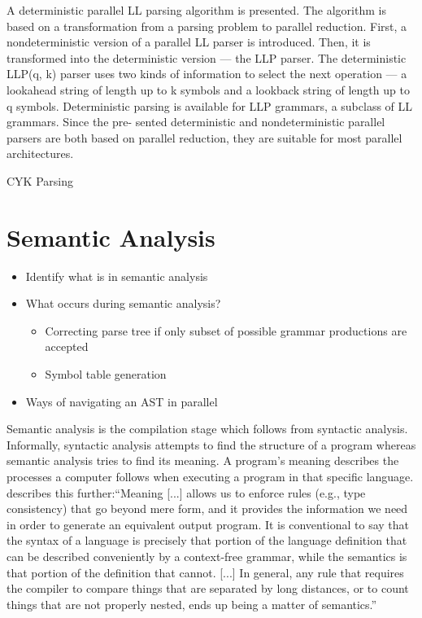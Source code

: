 \cite{vagner_parallel_2007} A deterministic parallel LL parsing algorithm is
presented. The algorithm is based on a transformation from a parsing problem to
parallel reduction. First, a nondeterministic version of a parallel LL parser
is introduced. Then, it is transformed into the deterministic version — the
LLP parser. The deterministic LLP(q, k) parser uses two kinds of information to
select the next operation — a lookahead string of length up to k symbols and a
lookback string of length up to q symbols. Deterministic parsing is available
for LLP grammars, a subclass of LL grammars. Since the pre- sented deterministic
and nondeterministic parallel parsers are both based on parallel reduction, they
are suitable for most parallel architectures.

\cite{mark_thierry_vandevoorde_parallel_1988}

\cite{alblas_bibliography_1994}

CYK Parsing \cite{skrzypczak_parallel_nodate}

\section{Semantic Analysis} \label{lit_review_analysis}
\begin{itemize}
    \item Identify what is in semantic analysis
    \item What occurs during semantic analysis?
    \begin{itemize}
        \item Correcting parse tree if only subset of possible grammar productions are accepted
        \item Symbol table generation
    \end{itemize}
    \item Ways of navigating an AST in parallel
\end{itemize}

Semantic analysis is the compilation stage which follows from syntactic
analysis. Informally, syntactic analysis attempts to find the structure of
a program whereas semantic analysis tries to find its meaning. A program's
meaning describes the processes a computer follows when executing a program
in that specific language. \cite{scott_programming_2015} describes this
further:``Meaning [...] allows us to enforce rules (e.g., type consistency)
that go beyond mere form, and it provides the information we need in order to
generate an equivalent output program. It is conventional to say that the syntax
of a language is precisely that portion of the language definition that can be
described conveniently by a context-free grammar, while the semantics is that
portion of the definition that cannot. [...] In general, any rule that requires
the compiler to compare things that are separated by long distances, or to count
things that are not properly nested, ends up being a matter of semantics.''


